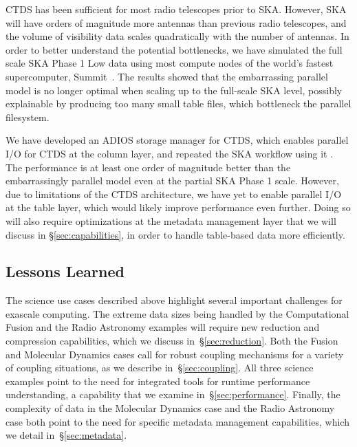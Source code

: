 CTDS has been sufficient for most radio telescopes prior to 
SKA. However, SKA will have orders of magnitude more antennas than previous radio telescopes, and the volume of visibility data scales quadratically with the number of antennas. 
In order to better understand the potential bottlenecks, we have simulated the full scale SKA Phase 1 Low data using most compute nodes of the world's fastest supercomputer, Summit~\cite{WANG2019}. The results showed that the embarrassing parallel model is no longer optimal when scaling up to the full-scale SKA level,
possibly explainable by producing too many small table files,
which bottleneck the parallel filesystem.


We have developed an ADIOS storage manager for CTDS, which
enables parallel I/O for CTDS at the column
layer, and repeated the SKA workflow using it \cite{WANG2016}.
The performance is at least one order of magnitude better than the embarrassingly parallel model even at the partial SKA Phase 1 scale. However, due to limitations of the CTDS architecture, we have yet to enable parallel I/O at the table layer, which would likely improve performance even further. Doing so will also require optimizations at the metadata management layer that we will discuss in \S\ref{sec:capabilities}, in order to handle table-based data more efficiently.

\subsection{Lessons Learned}

The science use cases described above highlight several important challenges for exascale computing. 
The extreme data sizes being handled by the Computational Fusion and the Radio Astronomy examples will require new reduction and compression capabilities, which we discuss in~\S\ref{sec:reduction}.
Both the Fusion and Molecular Dynamics cases call for robust coupling mechanisms for a variety of coupling situations, as we describe in~\S\ref{sec:coupling}. All three science examples point to the need for integrated tools for runtime performance understanding, a capability that we examine in~\S\ref{sec:performance}. Finally, the complexity of data in the Molecular Dynamics case and the Radio Astronomy case both point to the need for specific metadata management capabilities, which we detail in~\S\ref{sec:metadata}.



